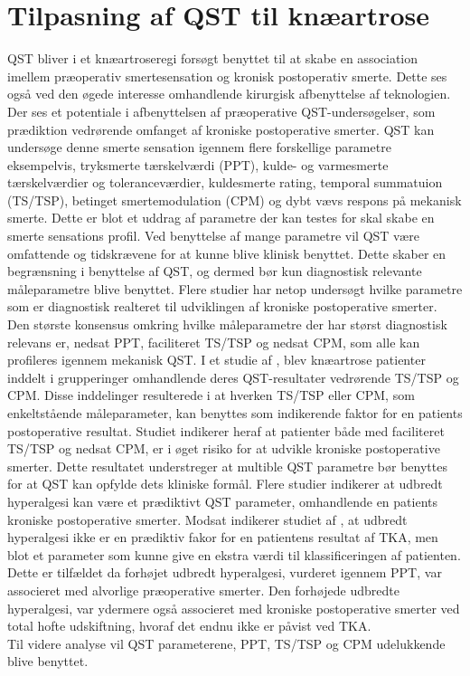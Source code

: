 \section{Tilpasning af QST til knæartrose}
QST bliver i et knæartroseregi forsøgt benyttet til at skabe en association imellem præoperativ smertesensation og kronisk postoperativ smerte. Dette ses også ved den øgede interesse omhandlende kirurgisk afbenyttelse af teknologien. Der ses et potentiale i afbenyttelsen af præoperative QST-undersøgelser, som prædiktion vedrørende omfanget af kroniske postoperative smerter. \citep{Wylde2013} \citep{Lunn2013} QST kan undersøge denne smerte sensation igennem flere forskellige parametre eksempelvis, tryksmerte tærskelværdi (PPT), kulde- og varmesmerte tærskelværdier og toleranceværdier, kuldesmerte rating, temporal summatuion (TS/TSP), betinget smertemodulation (CPM) og dybt vævs respons på mekanisk smerte. \citep{Cornelius2015} Dette er blot et uddrag af parametre der kan testes for skal skabe en smerte sensations profil. Ved benyttelse af mange parametre vil QST være omfattende og tidskrævene for at kunne blive klinisk benyttet. Dette skaber  en begrænsning i benyttelse af QST, og dermed bør kun diagnostisk relevante måleparametre blive benyttet. \citep{Lunn2013} Flere studier har netop undersøgt hvilke parametre som er diagnostisk realteret til udviklingen af kroniske postoperative smerter. Den største konsensus omkring hvilke måleparametre der har størst diagnostisk relevans er, nedsat PPT, faciliteret TS/TSP og nedsat CPM, som alle kan profileres igennem mekanisk QST. \citep{Petersen2015} \citep{Petersen2016} \citep{Wylde2015} I et studie af , blev knæartrose patienter inddelt i grupperinger omhandlende deres QST-resultater vedrørende TS/TSP og CPM. Disse inddelinger resulterede i at hverken TS/TSP eller CPM, som enkeltstående måleparameter, kan benyttes som indikerende faktor for en patients postoperative resultat. Studiet indikerer heraf at patienter både med faciliteret TS/TSP og nedsat CPM, er i øget risiko for at udvikle kroniske postoperative smerter.  Dette resultatet understreger at multible QST parametre bør benyttes for at QST kan opfylde dets kliniske formål. \citep{Petersen2016} Flere studier indikerer at udbredt hyperalgesi kan være et prædiktivt QST parameter, omhandlende en patients kroniske postoperative smerter. \citep{Petersen2016} \citep{Wylde2013} Modsat indikerer studiet af , at udbredt hyperalgesi ikke er en prædiktiv fakor for en patientens resultat af TKA, men blot et parameter som kunne give en ekstra værdi til klassificeringen af patienten. Dette er tilfældet da forhøjet udbredt hyperalgesi, vurderet igennem PPT, var associeret med alvorlige præoperative smerter. Den forhøjede udbredte hyperalgesi, var ydermere også associeret med kroniske postoperative smerter ved total hofte udskiftning, hvoraf det endnu ikke er påvist ved TKA. \citep{Wylde2015} \\
Til videre analyse vil QST parameterene, PPT, TS/TSP og CPM udelukkende blive benyttet. 